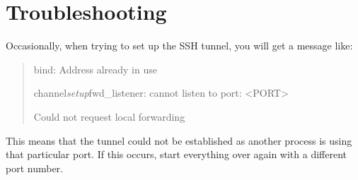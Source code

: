 \documentclass[a4paper]{article}
\newenvironment{ttt}{\ttfamily}{\par} %
\begin{document}
\section{Troubleshooting}
\label{sec:trouble}
Occasionally, when trying to set up the SSH tunnel, you will get a message like:
\begin{quote}
\begin{ttt}
bind: Address already in use

channel\emph{setup}fwd\_listener: cannot listen to port: \textless{}PORT\textgreater{}

Could not request local forwarding
\end{ttt}
\end{quote}

This means that the tunnel could not be established as another process is using that particular port.
If this occurs, start everything over again with a different port number.

\newpage


\end{document}

